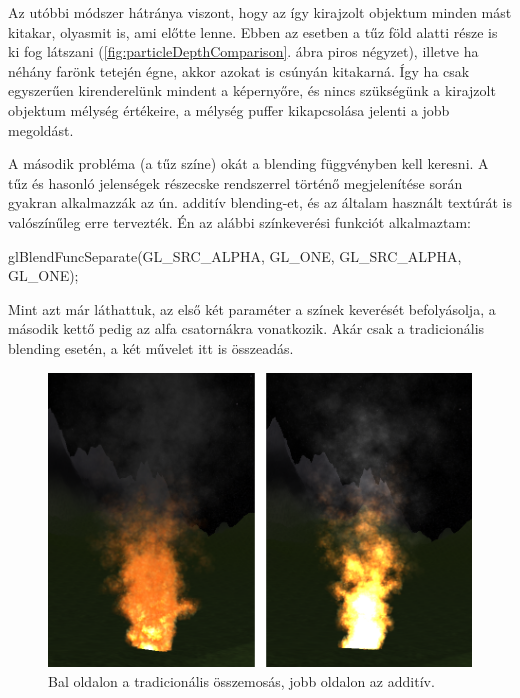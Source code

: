 Az utóbbi módszer hátránya viszont, hogy az így kirajzolt objektum minden mást kitakar, olyasmit is, ami előtte lenne. Ebben az esetben a tűz föld alatti része is ki fog látszani (\ref{fig:particleDepthComparison}. ábra piros négyzet), illetve ha néhány farönk tetején égne, akkor azokat is csúnyán kitakarná. Így ha csak egyszerűen kirenderelünk mindent a képernyőre, és nincs szükségünk a kirajzolt objektum mélység értékeire, a mélység puffer kikapcsolása jelenti a jobb megoldást.


A második probléma (a tűz színe) okát a blending függvényben kell keresni. A tűz és hasonló jelenségek részecske rendszerrel történő megjelenítése során gyakran alkalmazzák az ún. additív blending-et, és az általam használt textúrát is valószínűleg erre tervezték. Én az alábbi színkeverési funkciót alkalmaztam: 
\begin{cpp}
glBlendFuncSeparate(GL_SRC_ALPHA, GL_ONE, GL_SRC_ALPHA, GL_ONE);
\end{cpp}
Mint azt már láthattuk, az első két paraméter a színek keverését befolyásolja, a második kettő pedig az alfa csatornákra vonatkozik. Akár csak a tradicionális blending esetén, a két művelet itt is összeadás. 
\begin{figure}[h]
 \centering
 \includegraphics[width=\textwidth]{kepek/particleBlendingComparison.png}
 \caption{Bal oldalon a tradicionális összemosás, jobb oldalon az additív.}
 \label{fig:particleBlendingComparison}
\end{figure}

